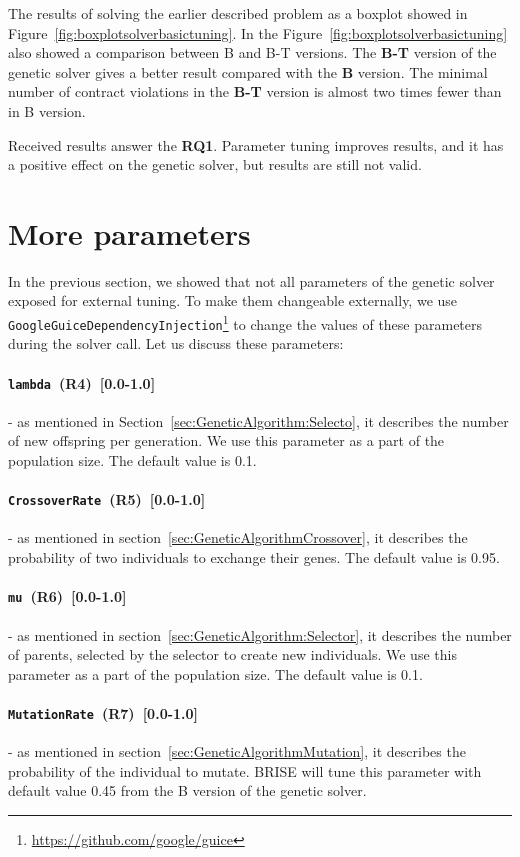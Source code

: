 The results of solving the earlier described problem as a boxplot showed in Figure~\ref{fig:boxplotsolverbasictuning}. In the Figure~\ref{fig:boxplotsolverbasictuning} also showed a comparison between B and B-T versions.  The \textbf{B-T} version of the genetic solver gives a better result compared with the \textbf{B} version. The minimal number of contract violations in the \textbf{B-T} version is almost two times fewer than in B version. 

Received results answer the \textbf{RQ1}. Parameter tuning improves results, and it has a positive effect on the genetic solver, but results are still not valid. 

\section{More parameters}

In the previous section, we showed that not all parameters of the genetic solver exposed for external tuning. To make them changeable externally, we use \texttt{GoogleGuiceDependencyInjection}\footnote{\url{https://github.com/google/guice}} to change the values of these parameters during the solver call. Let us discuss these parameters:
\paragraph{\texttt{lambda}~(R4)~[0.0-1.0]} - as mentioned in Section~\ref{sec:GeneticAlgorithm:Selecto}, it describes the number of new offspring per generation. We use this parameter as a part of the population size. The default value is 0.1.
\paragraph{\texttt{CrossoverRate}~(R5)~[0.0-1.0]} - as mentioned in section~\ref{sec:GeneticAlgorithmCrossover}, it describes the probability of two individuals to exchange their genes. The default value is 0.95.
\paragraph{\texttt{mu}~(R6)~[0.0-1.0]} - as mentioned in section~\ref{sec:GeneticAlgorithm:Selector}, it describes the number of parents, selected by the selector to create new individuals. We use this parameter as a part of the population size. The default value is 0.1.
\paragraph{\texttt{MutationRate}~(R7)~[0.0-1.0]} - as mentioned in section~\ref{sec:GeneticAlgorithmMutation}, it describes the probability of the individual to mutate. BRISE will tune this parameter with default value 0.45 from the B version of the genetic solver.
